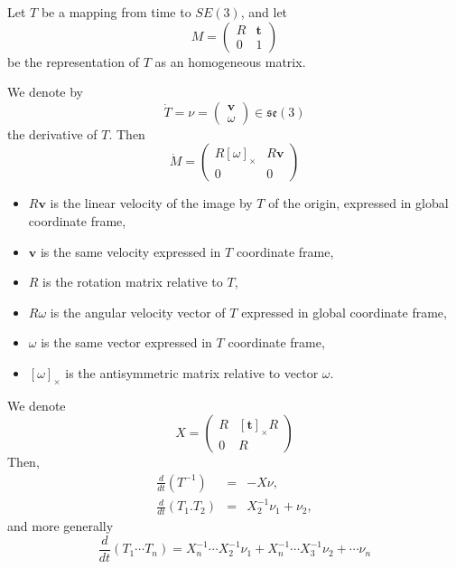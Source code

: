 \documentclass {article}
\newcommand\transf{T}
\newcommand\se[1]{\mathfrak{se}(#1)}
\newcommand\transl{\mathbf{t}}
\newcommand\linvel{\mathbf{v}}
\newcommand\angvel{\omega}
\newcommand\cross[1]{\left[#1\right]_{\times}}
\begin{document}
Let $\transf$ be a mapping from time to $SE(3)$, and let
$$M=\left(\begin{array}{cc}R & \transl \\ 0 & 1\end{array}\right)$$
be the representation of $\transf$ as an homogeneous matrix.

We denote by
\begin{equation}\label{eq:screw}
  \dot{\transf}=\nu=\left(\begin{array}{c}\linvel\\\angvel\end{array}\right)\in \se{3}
\end{equation}
the derivative of $\transf$. Then
$$
\dot{M} = \left(\begin{array}{cc}R\cross{\angvel} & R\linvel\\
  0 & 0\end{array}\right)
$$
\begin{itemize}
\item $R\linvel$ is the linear velocity of the image by $\transf$ of the origin, expressed in global coordinate frame,
\item $\linvel$ is the same velocity expressed in  $\transf$ coordinate frame,
\item $R$ is the rotation matrix relative to $\transf$,
\item $R\angvel$ is the angular velocity vector of $\transf$ expressed in
  global coordinate frame,
\item $\angvel$ is the same vector expressed in $\transf$ coordinate frame,
\item $\cross{\angvel}$ is the antisymmetric matrix relative to vector $\angvel$.
\end{itemize}

We denote
$$
X = \left(\begin{array}{cc}R&\cross{\transl}R\\0&R\end{array}\right)
$$
Then,
\begin{eqnarray}
  \label{eq:derivative-inverse}
  \frac{d}{dt}(\transf^{-1}) &=& -X\nu,\\
  \frac{d}{dt}(\transf_1.\transf_2) &=&X_2^{-1}\nu_1+\nu_2,
\end{eqnarray}
and more generally
\begin{equation}\label{eq:derivative-product}
\frac{d}{dt}(\transf_1\cdots\transf_n) = X_n^{-1}\cdots X_2^{-1}\nu_1 + X_n^{-1}\cdots X_3^{-1}\nu_2 + \cdots \nu_n
\end{equation}
\end{document}
